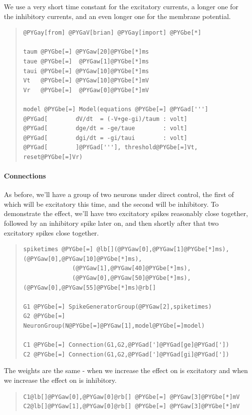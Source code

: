 \documentclass[letterpaper,10pt]{manual}
\begin{document}
We use a very short time constant for the excitatory currents, a longer one
for the inhibitory currents, and an even longer one for the membrane
potential.
\begin{quote}

\begin{Verbatim}[commandchars=@\[\]]
@PYGay[from] @PYGaV[brian] @PYGay[import] @PYGbe[*]

taum @PYGbe[=] @PYGaw[20]@PYGbe[*]ms
taue @PYGbe[=]  @PYGaw[1]@PYGbe[*]ms
taui @PYGbe[=] @PYGaw[10]@PYGbe[*]ms
Vt   @PYGbe[=] @PYGaw[10]@PYGbe[*]mV
Vr   @PYGbe[=]  @PYGaw[0]@PYGbe[*]mV

model @PYGbe[=] Model(equations @PYGbe[=] @PYGad[''']
@PYGad[        dV/dt  = (-V+ge-gi)/taum : volt]
@PYGad[        dge/dt = -ge/taue        : volt]
@PYGad[        dgi/dt = -gi/taui        : volt]
@PYGad[        ]@PYGad['''], threshold@PYGbe[=]Vt, reset@PYGbe[=]Vr)
\end{Verbatim}
\end{quote}


\paragraph{Connections}

As before, we'll have a group of two neurons under direct control, the first
of which will be excitatory this time, and the second will be inhibitory. To
demonstrate the effect, we'll have two excitatory spikes reasonably close
together, followed by an inhibitory spike later on, and then shortly after
that two excitatory spikes close together.
\begin{quote}

\begin{Verbatim}[commandchars=@\[\]]
spiketimes @PYGbe[=] @lb[](@PYGaw[0],@PYGaw[1]@PYGbe[*]ms),(@PYGaw[0],@PYGaw[10]@PYGbe[*]ms),
              (@PYGaw[1],@PYGaw[40]@PYGbe[*]ms),
              (@PYGaw[0],@PYGaw[50]@PYGbe[*]ms),(@PYGaw[0],@PYGaw[55]@PYGbe[*]ms)@rb[]

G1 @PYGbe[=] SpikeGeneratorGroup(@PYGaw[2],spiketimes)
G2 @PYGbe[=] NeuronGroup(N@PYGbe[=]@PYGaw[1],model@PYGbe[=]model)

C1 @PYGbe[=] Connection(G1,G2,@PYGad[']@PYGad[ge]@PYGad['])
C2 @PYGbe[=] Connection(G1,G2,@PYGad[']@PYGad[gi]@PYGad['])
\end{Verbatim}
\end{quote}

The weights are the same - when we increase  the effect on  is excitatory
and when we increase  the effect on  is inhibitory.
\begin{quote}

\begin{Verbatim}[commandchars=@\[\]]
C1@lb[]@PYGaw[0],@PYGaw[0]@rb[] @PYGbe[=] @PYGaw[3]@PYGbe[*]mV
C2@lb[]@PYGaw[1],@PYGaw[0]@rb[] @PYGbe[=] @PYGaw[3]@PYGbe[*]mV
\end{Verbatim}
\end{quote}
\end{document}

